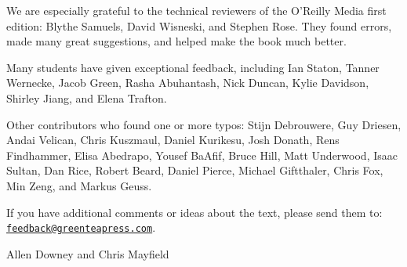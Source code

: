 We are especially grateful to the technical reviewers of the O'Reilly Media first edition: Blythe Samuels, David Wisneski, and Stephen Rose.
They found errors, made many great suggestions, and helped make the book much better.

Many students have given exceptional feedback, including Ian Staton, Tanner Wernecke, Jacob Green, Rasha Abuhantash, Nick Duncan, Kylie Davidson, Shirley Jiang, and Elena Trafton.

Other contributors who found one or more typos: Stijn Debrouwere, Guy Driesen, Andai Velican, Chris Kuszmaul, Daniel Kurikesu, Josh Donath, Rens Findhammer, Elisa Abedrapo, Yousef BaAfif, Bruce Hill, Matt Underwood, Isaac Sultan, Dan Rice, Robert Beard, Daniel Pierce, Michael Giftthaler, Chris Fox, Min Zeng, and Markus Geuss.


If you have additional comments or ideas about the text, please send them to: \href{mailto:feedback@greenteapress.com}{\tt feedback@greenteapress.com}.

Allen Downey and Chris Mayfield
